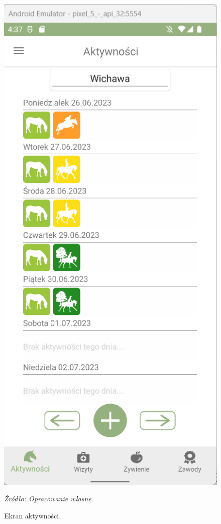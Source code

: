 \documentclass[12pt,twoside]{report}
\begin{document}
\begin{figure}
	\centering
	\includegraphics[scale=0.8]{ActivityView}
	\caption{Ekran aktywności.}
	\textit{Źródło: Opracowanie własne}
	\label{ActivityView}
\end{figure} 
\end{document}
